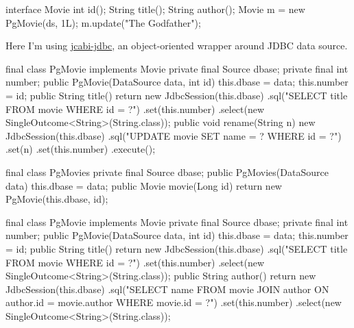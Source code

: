 \documentclass{article}
\begin{document}
\begin{pptWide}{2}
{\small\begin{ffcode}
interface Movie {
  int id();
  String title();
  String author();
}
Movie m = new PgMovie(ds, 1L);
m.update("The Godfather");
\end{ffcode}
}
\par
Here I'm using \href{https://github.com/jcabi/jcabi-jdbc}{jcabi-jdbc},
an object-oriented wrapper around JDBC data source.
\par\columnbreak\par
{\scriptsize\begin{ffcode}
final class PgMovie implements Movie
  private final Source dbase;
  private final int number;
  public PgMovie(DataSource data, int id)
    this.dbase = data;
    this.number = id;
  public String title()
    return new JdbcSession(this.dbase)
      .sql("SELECT title FROM movie WHERE id = ?")
      .set(this.number)
      .select(new SingleOutcome<String>(String.class));
  public void rename(String n)
    new JdbcSession(this.dbase)
      .sql("UPDATE movie SET name = ? WHERE id = ?")
      .set(n)
      .set(this.number)
      .execute();
\end{ffcode}
}
\end{pptWide}
\par
\plush{}

\begin{pptWide}{2}
{\small\begin{ffcode}
final class PgMovies
  private final Source dbase;
  public PgMovies(DataSource data)
    this.dbase = data;
  public Movie movie(Long id)
    return new PgMovie(this.dbase, id);
\end{ffcode}
}
\par\columnbreak\par
{\scriptsize\begin{ffcode}
final class PgMovie implements Movie
  private final Source dbase;
  private final int number;
  public PgMovie(DataSource data, int id)
    this.dbase = data;
    this.number = id;
  public String title()
    return new JdbcSession(this.dbase)
      .sql("SELECT title FROM movie WHERE id = ?")
      .set(this.number)
      .select(new SingleOutcome<String>(String.class));
  public String author()
    return new JdbcSession(this.dbase)
      .sql("SELECT name FROM movie JOIN author ON author.id = movie.author WHERE movie.id = ?")
      .set(this.number)
      .select(new SingleOutcome<String>(String.class));
\end{ffcode}
}
\end{pptWide}
\par
\plush{}
\end{document}
